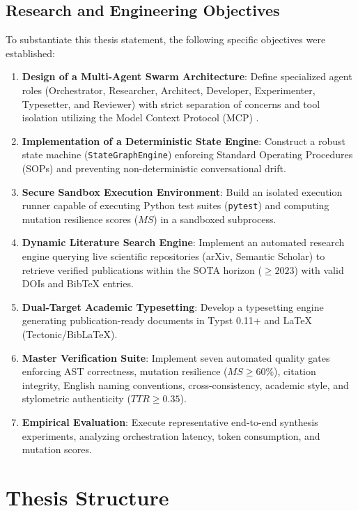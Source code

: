 \subsection{Research and Engineering Objectives}
To substantiate this thesis statement, the following specific objectives were established:
\begin{enumerate}
    \item \textbf{Design of a Multi-Agent Swarm Architecture}: Define specialized agent roles (Orchestrator, Researcher, Architect, Developer, Experimenter, Typesetter, and Reviewer) with strict separation of concerns and tool isolation utilizing the Model Context Protocol (MCP) \cite{AnthropicMCP2024}.
    \item \textbf{Implementation of a Deterministic State Engine}: Construct a robust state machine (\texttt{StateGraphEngine}) enforcing Standard Operating Procedures (SOPs) \cite{Hong2024MetaGPT} and preventing non-deterministic conversational drift.
    \item \textbf{Secure Sandbox Execution Environment}: Build an isolated execution runner capable of executing Python test suites (\texttt{pytest}) and computing mutation resilience scores ($MS$) in a sandboxed subprocess.
    \item \textbf{Dynamic Literature Search Engine}: Implement an automated research engine querying live scientific repositories (arXiv, Semantic Scholar) to retrieve verified publications within the SOTA horizon ($\ge 2023$) with valid DOIs and BibTeX entries.
    \item \textbf{Dual-Target Academic Typesetting}: Develop a typesetting engine generating publication-ready documents in Typst 0.11+ and LaTeX (Tectonic/BibLaTeX).
    \item \textbf{Master Verification Suite}: Implement seven automated quality gates enforcing AST correctness, mutation resilience ($MS \ge 60\%$), citation integrity, English naming conventions, cross-consistency, academic style, and stylometric authenticity ($TTR \ge 0.35$).
    \item \textbf{Empirical Evaluation}: Execute representative end-to-end synthesis experiments, analyzing orchestration latency, token consumption, and mutation scores.
\end{enumerate}

\section{Thesis Structure}
\label{sec:thesis_structure}

